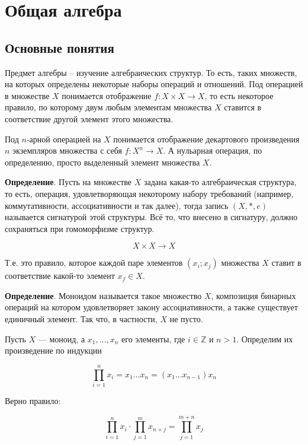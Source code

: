 \documentclass[a4paper]{book}
\begin{document}
\chapter{Общая алгебра}
\section{Основные понятия}
Предмет алгебры -- изучение алгебраических структур. То есть, таких множеств, на которых определены некоторые наборы операций и отношений. 
Под операцией в множестве $X$ понимается отображение $f: X\times X \rightarrow X$, то есть некоторое правило, по которому двум любым элементам множества $X$ ставится в соответствие другой элемент этого множества.  

Под $n$-арной операцией на $X$ понимается отображение декартового произведения $n$ экземпляров множества с себя $f:X^n\rightarrow X$. А нульарная операция, по определению, просто выделенный элемент множества $X$. 

\textbf{Определение}. Пусть на множестве $X$ задана какая-то алгебраическая структура, то есть, операция, удовлетворяющая некоторому набору требований (например, коммутативности, ассоциативности и так далее), тогда запись $(X,*,e)$ называется сигнатурой этой структуры. Всё то, что внесено в сигнатуру, должно сохраняться при гомоморфизме структур. 

\begin{equation}
X\times X \rightarrow X
\end{equation}

Т.е. это правило, которое каждой паре элементов $(x_i;x_j)$ множества $X$ ставит в соответствие какой-то элемент $x_f\in X$. 

\textbf{Определение}. Моноидом называется такое множество $X$, композиция бинарных операций на котором удовлетворяет закону ассоциативности, а также существует единичный элемент. Так что, в частности, $X$ не пусто.

Пусть $X$ — моноид, а $x_1, \dots, x_n$ его элементы, где $i \in \mathbb{Z}$ и $n > 1$. Определим их произведение по индукции 

\begin{equation}
	\prod\limits_{i=1}^n x_i = x_1\dots x_n = (x_1\dots x_{n-1})x_n
\end{equation}

Верно правило: 

\begin{equation}
	\prod\limits_{i=1}^{n} x_i \cdot \prod\limits_{j=1}^{m} x_{n+j} = \prod\limits_{j=1}^{m+n} x_j
\end{equation}
\end{document}
